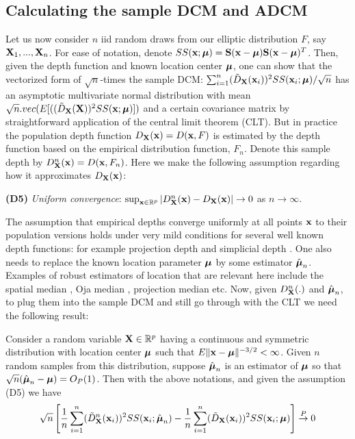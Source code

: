 \documentclass[fleqn,11pt]{article}
\begin{document}
\subsection{Calculating the sample DCM and ADCM}
Let us now consider $n$ iid random draws from our elliptic distribution $F$, say ${\mathbf{X}}_1,...,{\mathbf{X}}_n$. For ease of notation, denote $SS({\bf{x}}; {\boldsymbol{\mu}}) = {\mathbf{S}}({\bf{x}} - {\boldsymbol{\mu}}) {\mathbf{S}}({\bf{x}} - {\boldsymbol{\mu}})^T$. Then, given the depth function and known location center ${\boldsymbol{\mu}}$, one can show that the vectorized form of $\sqrt n$-times the sample DCM: $\sum_{i=1}^n (\tilde D_{\mathbf{X}}({\bf{x}}_i))^2SS({\bf{x}}_i; {\boldsymbol{\mu}}) /\sqrt{n}$  has an asymptotic multivariate normal distribution with mean $\sqrt n.vec(E[( (\tilde D_{\mathbf{X}} ({\mathbf{X}}))^2 SS({\bf{x}}; {\boldsymbol{\mu}})])$ and a certain covariance matrix by straightforward application of the central limit theorem (CLT). But in practice the population depth function $D_{\mathbf{X}}({\bf{x}}) = D({\bf{x}}, F)$ is estimated by the depth function based on the empirical distribution function, $F_n$. Denote this sample depth by $D^n_{\mathbf{X}} ({\bf{x}}) = D({\bf{x}}, F_n)$. Here we make the following assumption regarding how it approximates $D_{\mathbf{X}}({\bf{x}})$:

\vspace{1em}
\noindent\textbf{(D5)} \textit{Uniform convergence}: $\sup_{{\bf{x}} \in \mathbb R^p} | D^n_{\mathbf{X}} ({\bf{x}}) - D_{\mathbf{X}} ({\bf{x}}) | \rightarrow 0$ as $n \rightarrow \infty $.
\vspace{1em}

The assumption that empirical depths converge uniformly at all points ${\bf{x}}$ to their population versions holds under very mild conditions for several well known depth functions: for example projection depth \citep{zuo03} and simplicial depth \citep{Dumbgen92}. One also needs to replace the known location parameter ${\boldsymbol{\mu}}$ by some estimator $\hat{{\boldsymbol{\mu}}}_n$. Examples of robust estimators of location that are relevant here include the spatial median \citep{haldane48,brown83}, Oja median \citep{oja83}, projection median \citep{zuo03} etc. Now, given $D^n_{\mathbf{X}}(.)$ and $\hat {{\boldsymbol{\mu}}}_n$, to plug them into the sample DCM and still go through with the CLT we need the following result:

\begin{Lemma} \label{Lemma:lemma1}
Consider a random variable ${\mathbf{X}} \in \mathbb{R}^p$ having a continuous and symmetric distribution with location center ${\boldsymbol{\mu}}$ such that $E\|{\bf{x}} - {\boldsymbol{\mu}} \|^{-3/2} < \infty$. Given $n$ random samples from this distribution, suppose $\hat{{\boldsymbol{\mu}}}_n$ is an estimator of ${\boldsymbol{\mu}}$ so that $\sqrt n (\hat{{\boldsymbol{\mu}}}_n - {\boldsymbol{\mu}}) = O_P(1) $. Then with the above notations, and given the assumption (D5) we have
%
$$ \sqrt n \left[
\frac{1}{n} \sum_{i=1}^n (\tilde D^n_{\mathbf{X}} ({\bf{x}}_i))^2 SS({\bf{x}}_i; \hat{{\boldsymbol{\mu}}}_n) -
\frac{1}{n} \sum_{i=1}^n (\tilde D_{\mathbf{X}} ({\bf{x}}_i))^2 SS({\bf{x}}_i; {\boldsymbol{\mu}}) \right]
\stackrel{P}{\rightarrow} 0 $$
\end{Lemma}
\end{document}
